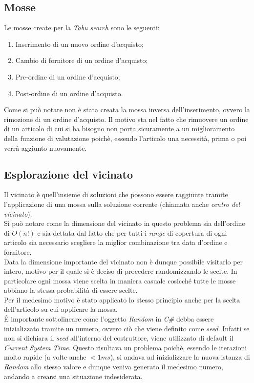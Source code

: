 \subsection{Mosse}
\label{sec:mosse}
\noindent Le mosse create per la \textit{Tabu search} sono le seguenti:
\begin{enumerate}
    \item Inserimento di un nuovo ordine d'acquisto;
    \item Cambio di fornitore di un ordine d'acquisto;
    \item Pre-ordine di un ordine d'acquisto;
    \item Post-ordine di un ordine d'acquisto.
\end{enumerate}
Come si può notare non è stata creata la mossa inversa dell'inserimento, ovvero la rimozione di un ordine d'acquisto.
Il motivo sta nel fatto che rimuovere un ordine di un articolo di cui si ha bisogno non porta sicuramente a un miglioramento
della funzione di valutazione poichè, essendo l'articolo una necessità, prima o poi verrà aggiunto nuovamente.

\subsection{Esplorazione del vicinato}
\label{sec:esplorazione-vicinato}
\noindent Il vicinato è quell'insieme di soluzioni che possono essere raggiunte
tramite l'applicazione di una mossa sulla soluzione corrente (chiamata anche \textit{centro del vicinato}).\\
Si può notare come la dimensione del vicinato in questo problema sia dell'ordine di $O(n!)$ e sia dettata dal fatto che
per tutti i \textit{range} di copertura di ogni articolo sia necessario scegliere la miglior
combinazione tra data d'ordine e fornitore.\\
Data la dimensione importante del vicinato non è dunque possibile visitarlo per intero,
motivo per il quale si è deciso di procedere randomizzando le scelte.
In particolare ogni mossa viene scelta in maniera casuale cosicché tutte le mosse
abbiano la stessa probabilità di essere scelte.\\
Per il medesimo motivo è stato applicato lo stesso principio anche per la scelta dell'articolo su cui applicare
la mossa.\\
É importante sottolineare come l'oggetto \textit{Random} in \textit{C\#}
debba essere inizializzato tramite un numero, ovvero
ciò che viene definito come \textit{seed}. Infatti se non si dichiara
il \textit{seed} all'interno del costruttore, viene utilizzato di default il
\textit{Current System Time}. Questo risultava un problema poichè, essendo le
iterazioni molto rapide (a volte anche $<1ms$), si andava ad inizializzare la nuova istanza
di \textit{Random} allo stesso valore e dunque veniva generato il medesimo
numero, andando a crearsi una situazione indesiderata.


